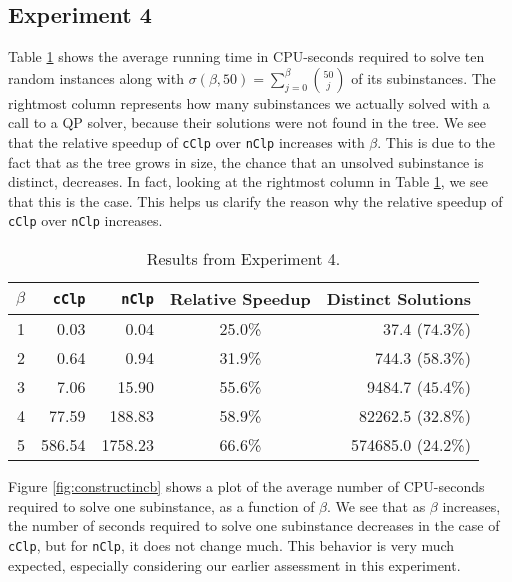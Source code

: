 \subsection*{Experiment 4}
Table \ref{table:exptwo} shows the average running time in CPU-seconds required
to solve ten random instances along with
$\sigma(\beta, 50) = \sum_{j=0}^{\beta} \binom{50}{j}$ of its subinstances.
The rightmost column represents how many subinstances we actually solved with
a call to a QP solver, because their solutions were not found in the tree.
We see that the relative speedup of \texttt{cClp} over \texttt{nClp}
increases with $\beta$.
This is due to the fact that as the tree grows in size, the chance that
an unsolved subinstance is distinct, decreases. In fact, looking at the
rightmost column in Table \ref{table:exptwo}, we see that this is the case.
This helps us clarify the
reason why the relative speedup of \texttt{cClp} over \texttt{nClp} increases.
\begin{table}[ht!]
\centering
\caption{Results from Experiment 4.}
\begin{tabular}{rrrcr}
      $\beta$ & \texttt{cClp} & \texttt{nClp} & Relative Speedup & Distinct Solutions\\ \hline
       1  & 0.03 & 0.04 & 25.0\% & 37.4 ($74.3$\%) \\
       2  & 0.64 & 0.94 & 31.9\% & 744.3 ($58.3$\%) \\
       3  & 7.06 & 15.90 & 55.6\% & 9484.7 ($45.4$\%) \\
       4  & 77.59 & 188.83 & 58.9\% & 82262.5 ($32.8$\%) \\
       5  & 586.54 & 1758.23 & 66.6\% & 574685.0 ($24.2$\%) \\
\end{tabular}
\label{table:exptwo}
\end{table}

Figure \ref{fig:constructincb} shows a plot of the average number of
CPU-seconds required to solve one subinstance, as a function of $\beta$.
We see that as $\beta$ increases, the number of seconds required to solve
one subinstance decreases in the case of \texttt{cClp},
but for \texttt{nClp}, it does not change much. This behavior is very
much expected, especially considering our earlier assessment in this
experiment.

